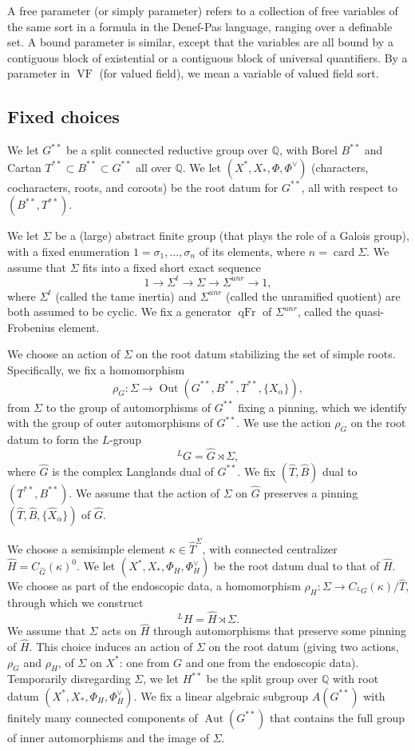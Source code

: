 \documentclass[12pt]{amsart}
\newcommand{\op}[1]{\operatorname{#1}}
\newcommand{\ring}[1]{{\mathbb #1}}
\def\VF{{\op{VF}}}
\theoremstyle{plain}
\theoremstyle{definition}
\begin{document}
A free parameter (or simply parameter) refers to a collection of free
variables of the same sort in a formula in the Denef-Pas language,
ranging over a definable set.  A bound parameter is similar, except
that the variables are all bound by a contiguous block of existential
or a contiguous block of universal quantifiers.  By a parameter in
$\VF$ (for valued field), we mean a variable of valued field sort.


\subsection{Fixed choices}\label{sec:fixed}

We let $G^{**}$ be a split connected reductive group over $\ring{Q}$,
with Borel $B^{**}$ and Cartan $T^{**}\subset B^{**} \subset G^{**}$
all over $\ring{Q}$.  We let $(X^*,X_*,\Phi,\Phi^\vee)$ (characters,
cocharacters, roots, and coroots) be the root
datum for $G^{**}$,
all with respect to
$(B^{**},T^{**})$.  

We let $\Sigma$ be a (large) abstract finite group (that plays the
role of a Galois group), with a fixed enumeration
$1=\sigma_1,\ldots,\sigma_n$ of its elements, where $n =
\op{card}{\Sigma}$.
We assume that $\Sigma$ fits into a fixed short exact sequence
\[
1 \to \Sigma^t \to \Sigma \to \Sigma^{unr} \to 1,
\]
where $\Sigma^t$ (called the tame inertia) and $\Sigma^{unr}$ (called
the unramified quotient) are both assumed to be cyclic.  We fix a
generator $\op{qFr}$ of $\Sigma^{unr}$, called the quasi-Frobenius
element.


We choose an action of $\Sigma$ on the root datum stabilizing the set
of simple roots.  Specifically, we fix a homomorphism
\[
\rho_G:\Sigma\to \op{Out}(G^{**},B^{**},T^{**},\{X_\alpha\}),
\]
from $\Sigma$ to the group of automorphisms of $G^{**}$ fixing a
pinning, which we identify with the group of outer automorphisms of
$G^{**}$.  We use the action $\rho_G$ on the root datum to form the
$L$-group
\[
{}^LG = \hat G \rtimes \Sigma,
\]
where $\hat G$ is the complex Langlands dual of $G^{**}$.
We fix $(\hat T,\hat B)$ dual to $(T^{**},B^{**})$.    We assume
that the action of $\Sigma$ on $\hat G$ preserves a pinning
$(\hat T,\hat B,\{\hat X_\alpha\})$ of $\hat G$.  

We choose a semisimple element $\kappa\in \hat T^\Sigma$, with
connected centralizer $\hat H = C_{\hat G}(\kappa)^0$.  We let
$(X^*,X_*,\Phi_H,\Phi_H^\vee)$ be the root datum dual to that
of $\hat H$.  We choose as part of the endoscopic data,
a homomorphism $\rho_H:\Sigma \to C_{{}^LG}(\kappa)/\hat T$,
through which we construct
\[
{}^LH = \hat H \rtimes \Sigma.
\]
We assume that $\Sigma$ acts on $\hat H$ through automorphisms that
preserve some pinning of $\hat H$.  This choice induces an action of
$\Sigma$ on the root datum (giving two actions, $\rho_G$ and $\rho_H$,
of $\Sigma$ on $X^*$: one from $G$ and one from the endoscopic data).
Temporarily disregarding $\Sigma$, we let $H^{**}$ be the split group
over $\ring{Q}$ with root datum $(X^*,X_*,\Phi_H,\Phi_H^\vee)$.  We
fix a linear algebraic subgroup $A(G^{**})$ with finitely many
connected components of $\op{Aut}(G^{**})$ that contains the full
group of inner automorphisms and the image of $\Sigma$.
\end{document}
